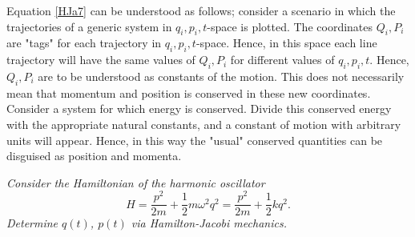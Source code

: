 Equation \eqref{HJa7} can be understood as follows; consider a scenario in which the trajectories of a generic system in $q_i,p_i,t$-space is plotted. The coordinates $Q_i,P_i$ are "tags" for each trajectory in $q_i,p_i,t$-space. Hence, in this space each line trajectory will have the same values of $Q_i,P_i$ for different values of $q_i,p_i,t$. Hence, $Q_i,P_i$ are to be understood as constants of the motion. This does not necessarily mean that momentum and position is conserved in these new coordinates. Consider a system for which energy is conserved. Divide this conserved energy with the appropriate natural constants, and a constant of motion with arbitrary units will appear. Hence, in this way the "usual" conserved quantities can be disguised as position and momenta.
\begin{example}
	\emph{Consider the Hamiltonian of the harmonic oscillator}
	\begin{equation}
		H=\frac{p^2}{2m}+\frac{1}{2}m\omega^2q^2=\frac{p^2}{2m}+\frac{1}{2}kq^2.
	\end{equation} 
	\emph{Determine $q(t)$, $p(t)$ via Hamilton-Jacobi mechanics.}\newline
	

\end{example}
